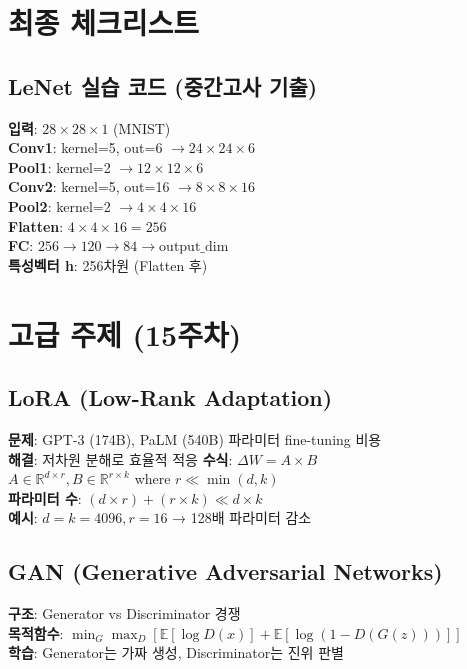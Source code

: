 \documentclass[6pt,landscape,a4paper]{article}
\begin{document}
\begin{multicols}{3}
\section{최종 체크리스트}

\subsection{LeNet 실습 코드 (중간고사 기출)}
\textbf{입력}: $28 \times 28 \times 1$ (MNIST)\\
\textbf{Conv1}: kernel=5, out=6 $\rightarrow 24 \times 24 \times 6$\\
\textbf{Pool1}: kernel=2 $\rightarrow 12 \times 12 \times 6$\\
\textbf{Conv2}: kernel=5, out=16 $\rightarrow 8 \times 8 \times 16$\\
\textbf{Pool2}: kernel=2 $\rightarrow 4 \times 4 \times 16$\\
\textbf{Flatten}: $4 \times 4 \times 16 = 256$\\
\textbf{FC}: $256 \rightarrow 120 \rightarrow 84 \rightarrow \text{output\_dim}$\\
\textbf{특성벡터 h}: 256차원 (Flatten 후)

\section{고급 주제 (15주차)}
\subsection{LoRA (Low-Rank Adaptation)}
\textbf{문제}: GPT-3 (174B), PaLM (540B) 파라미터 fine-tuning 비용\\
\textbf{해결}: 저차원 분해로 효율적 적응
\textbf{수식}: $\Delta W = A \times B$\\
$A \in \mathbb{R}^{d \times r}, B \in \mathbb{R}^{r \times k}$ where $r \ll \min(d,k)$\\
\textbf{파라미터 수}: $(d \times r) + (r \times k) \ll d \times k$\\
\textbf{예시}: $d=k=4096, r=16$ → 128배 파라미터 감소
\subsection{GAN (Generative Adversarial Networks)}
\textbf{구조}: Generator vs Discriminator 경쟁\\
\textbf{목적함수}: $\min_G \max_D [\mathbb{E}[\log D(x)] + \mathbb{E}[\log(1-D(G(z)))]]$\\
\textbf{학습}: Generator는 가짜 생성, Discriminator는 진위 판별


\end{multicols}
\end{document}
